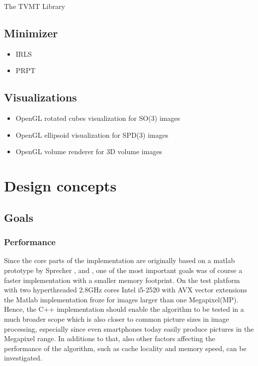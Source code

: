 \begin{chapter}{The TVMT Library}
\subsection{Minimizer} %
\label{sub:Minimizer}
\begin{itemize}
	\item IRLS
	\item PRPT
\end{itemize}

\subsection{Visualizations} %
\label{sub:Visualizations}
\begin{itemize}
    \item OpenGL rotated cubes visualization for SO(3) images
    \item OpenGL ellipsoid visualization for SPD(3) images
    \item OpenGL volume renderer for 3D volume images
\end{itemize}


\section{Design concepts} %
\label{sec:Design}

\subsection{Goals} %
\label{sub:Goals}

\subsubsection{Performance} %
\label{ssub:Performance}
Since the core parts of the implementation are originally based on a matlab prototype by Sprecher \cite{SprecherIRLS}, \cite{manuel} and \cite{mara}, one of the most important
goals was of course a faster implementation with a smaller memory footprint. On the test platform with two hyperthreaded 2.8GHz cores Intel i5-2520 with AVX vector extensions
the Matlab implementation froze for images larger than one Megapixel(MP). Hence, the C++ implementation should enable the algorithm to be tested in a much broader scope which is
also closer to common picture sizes in image processing, especially since even smartphones today easily produce pictures in the Megapixel range.
In additions to that, also other factors affecting the performance of the algorithm, such as cache locality and memory speed, can be investigated.\\


\end{chapter}
